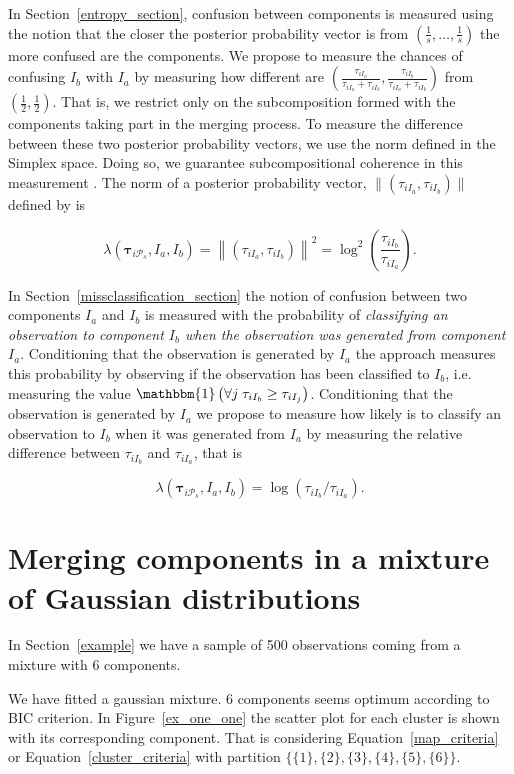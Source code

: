 \documentclass[10pt, a4paper]{article}
\newcommand{\m}[1]{\boldsymbol{#1}}
\begin{document}
\begin{spacing}{1.9}
In Section~\ref{entropy_section}, confusion between components is measured using the notion that the closer the posterior probability vector is from $(\frac{1}{s}, \dots, \frac{1}{s})$ the more confused are the components. We propose to measure the chances of confusing $I_b$ with $I_a$  by measuring how different are $(\frac{\tau_{i I_a}}{\tau_{i I_a} +\tau_{i I_b}}, \frac{\tau_{i I_b}}{\tau_{i I_a} + \tau_{i I_b}})$ from $(\frac{1}{2}, \frac{1}{2})$. That is, we restrict only on the subcomposition formed with the components taking part in the merging process. To measure the difference between these two posterior probability vectors, we use the norm defined in the Simplex space. Doing so, we guarantee subcompositional coherence in this measurement \citep{aitchison1986statistical}. The norm of a posterior probability vector, $\| (\tau_{iI_a}, \tau_{iI_b}) \|$  defined by \cite{aitchison2002simplicial} is 

\[
\lambda(\m\tau_{i \mathcal{P}_s},  I_a,  I_b) = \left\| (\tau_{iI_a}, \tau_{iI_b}) \right\|^2 = \log^2 \left(\frac{ \tau_{iI_b} }{ \tau_{iI_a} }\right).
\]


In Section~\ref{missclassification_section} the notion of confusion between two components $I_a$ and $I_b$ is measured with the probability of \emph{classifying an observation to component $I_b$ when the observation was generated from component $I_a$}. Conditioning that the observation is generated by $I_a$  the approach measures this probability by observing if the observation has been classified to $I_b$, i.e.  measuring the value $\mathbbm{1}\left( \forall j\; \tau_{i I_{b}} \geq \tau_{i I_j} \right)$. Conditioning that the observation is generated by $I_a$ we propose to measure how likely is to classify an observation to $I_b$ when it was generated from $I_a$ by measuring the relative difference between $\tau_{i I_b}$ and $\tau_{i I_a}$, that is 

\[
\lambda(\m\tau_{i \mathcal{P}_s},  I_a,  I_b) = \log( \tau_{i I_b}/\tau_{i I_a}).
\]

\section{Merging components in a mixture of Gaussian distributions}

In Section~\ref{example} we have a sample of 500 observations coming from a mixture with 6 components. 

We have fitted a gaussian mixture. 6 components seems optimum according to BIC criterion. In Figure~\ref{ex_one_one} the scatter plot for each cluster is shown with its corresponding component. That is considering Equation~\ref{map_criteria} or Equation~\ref{cluster_criteria} with partition $\{\{1\}, \{2\}, \{3\}, \{4\}, \{5\}, \{6\}\}$.


\end{spacing}
\end{document}

